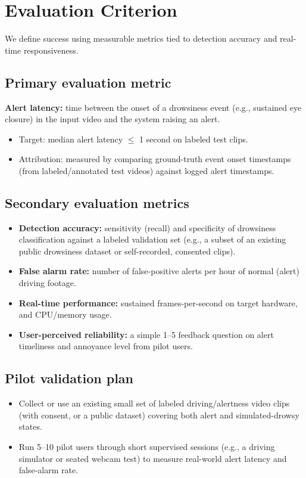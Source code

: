 \documentclass[11pt,a4paper]{article}
\begin{document}
\section{Evaluation Criterion}
We define success using measurable metrics tied to
detection accuracy and real-time responsiveness.

\subsection{Primary evaluation metric}
\textbf{Alert latency:} time between the onset of a
drowsiness event (e.g., sustained eye closure) in the
input video and the system raising an alert.
\begin{itemize}[leftmargin=0.7cm]
    \item Target: median alert latency $\le$ 1 second on labeled test clips.
    \item Attribution: measured by comparing ground-truth event onset timestamps (from labeled/annotated test videos) against logged alert timestamps.
\end{itemize}

\subsection{Secondary evaluation metrics}
\begin{itemize}[leftmargin=0.7cm]
    \item \textbf{Detection accuracy:} sensitivity (recall) and specificity of drowsiness classification against a labeled validation set (e.g., a subset of an existing public drowsiness dataset or self-recorded, consented clips).
    \item \textbf{False alarm rate:} number of false-positive alerts per hour of normal (alert) driving footage.
    \item \textbf{Real-time performance:} sustained frames-per-second on target hardware, and CPU/memory usage.
    \item \textbf{User-perceived reliability:} a simple 1--5 feedback question on alert timeliness and annoyance level from pilot users.
\end{itemize}

\subsection{Pilot validation plan}
\begin{itemize}[leftmargin=0.7cm]
    \item Collect or use an existing small set of labeled driving/alertness video clips (with consent, or a public dataset) covering both alert and simulated-drowsy states.
    \item Run 5--10 pilot users through short supervised sessions (e.g., a driving simulator or seated webcam test) to measure real-world alert latency and false-alarm rate.
\end{itemize}
\end{document}
